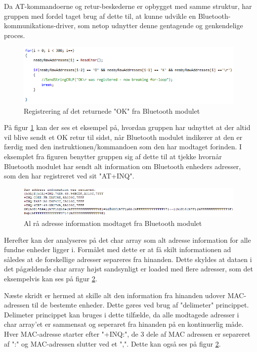 Da AT-kommandoerne og retur-beskederne er opbygget med samme struktur, har gruppen med fordel taget brug af dette til, at kunne udvikle en Bluetooth-kommunikations-driver, som netop udnytter denne gentagende og genkendelige proces. 

\begin{figure}[H]
	\centering
	\includegraphics[width = 400 pt]{Img/OK_registrered.PNG}
	\caption{Registrering af det returnede "OK" fra Bluetooth modulet}
	\label{fig:OK_registrered}
\end{figure}

På figur \ref{fig:OK_registrered} kan der ses et eksempel på, hvordan gruppen har udnyttet at der altid vil blive sendt et OK retur til sidst, når Bluetooth modulet indikerer at den er færdig med den instruktionen/kommandoen som den har modtaget forinden. I eksemplet fra figuren benytter gruppen sig af dette til at tjekke hvornår Bluetooth modulet har sendt alt information om Bluetooth enheders adresser, som den har registreret ved sit "AT+INQ".

\begin{figure}[H]
	\centering
	\includegraphics[width = 500 pt]{Img/raw_address.PNG}
	\caption{Al rå adresse information modtaget fra Bluetooth modulet}
	\label{fig:raw_address}
\end{figure}

Herefter kan der analyseres på det char array som alt adresse information for alle fundne enheder ligger i. Formålet med dette er at få skilt informationen ad således at de forskellige adresser separeres fra hinanden. Dette skyldes at dataen i det pågældende char array højst sandsynligt er loaded med flere adresser, som det eksempelvis kan ses på figur \ref{fig:raw_address}.

Næste skridt er hermed at skille alt den information fra hinanden udover MAC-adressen til de bestemte enheder. Dette gøres ved brug af "delimeter" princippet. Delimeter princippet kan bruges i dette tilfælde, da alle modtagede adresser i char array'et er sammensat og seperaret fra hinanden på en kontinuerlig måde. Hver MAC-adresse starter efter "+INQ:", de 3 dele af MAC adressen er separeret af ":" og MAC-adressen slutter ved et ",". Dette kan også ses på figur \ref{fig:raw_address}.


